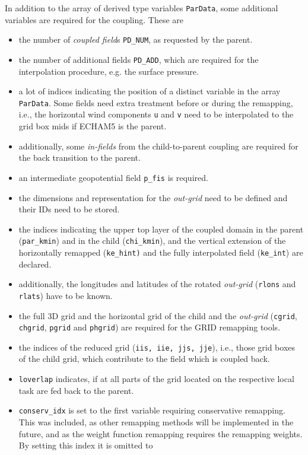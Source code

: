 \documentclass[11pt,twoside]{article}
\begin{document}
In addition to the array of derived type variables \verb|ParData|, some
additional variables are required for the coupling. These are
\begin{itemize} %
\item the number of {\it coupled field}s \verb|PD_NUM|, as requested by the parent.
\item the number of additional fields \verb|PD_ADD|, which are required for
the interpolation procedure, e.g. the surface pressure.
\item a lot of indices indicating the position of a distinct variable in the
array \verb|ParData|. Some fields need extra treatment before or during the 
remapping, i.e., the horizontal wind components \verb|u| and \verb|v| need to
be interpolated to the grid box mids if ECHAM5 is the parent.
\item additionally, some {\it in-fields} from the child-to-parent coupling are
required for the back transition to the parent.
\item an intermediate geopotential field \verb|p_fis| is required.
\item the dimensions and representation for the {\it out-grid} need to be defined
and their IDs need to be stored. 
\item the indices indicating the upper top layer of the coupled domain in
the parent (\verb|par_kmin|) and in the child (\verb|chi_kmin|), and
the vertical extension of the horizontally remapped (\verb|ke_hint)| and the
fully interpolated field (\verb|ke_int|) are declared.
\item additionally, the longitudes and latitudes of the rotated {\it out-grid}
(\verb|rlons| and \verb|rlats|) have to be known.
\item the full 3D grid and the horizontal grid of the child and the
{\it out-grid} (\verb|cgrid|, \verb|chgrid|, \verb|pgrid| and \verb|phgrid|) are
required for the GRID remapping tools.
\item the indices of the reduced grid (\verb|iis, iie, jjs, jje|), 
i.e., those grid boxes of the child
grid, which contribute to the field which is coupled back.
\item \verb|loverlap| indicates, if at all parts of the grid located on
the respective local task are fed back to the parent.
\item \verb|conserv_idx| is set to the first variable requiring
conservative remapping. This was included, as other remapping methods
will be implemented in the future, and as the weight function remapping
requires the remapping weights. By setting this index it is omitted to

\end{itemize}
\end{document}
